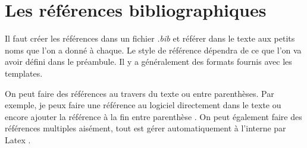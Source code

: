 \documentclass[../exemple_master.tex]{subfiles}
\begin{document}
\section{Les références bibliographiques}

Il faut créer les références dans un fichier \emph{.bib} et référer dans le texte aux petits noms que l'on a donné à chaque. Le style de référence dépendra de ce que l'on va avoir défini dans le préambule. Il y a généralement des formats fournis avec les templates.

On peut faire des références au travers du texte ou entre parenthèses. Par exemple, je peux faire une référence au logiciel \cite{WHAT2016} directement dans le texte ou encore ajouter la référence à la fin entre parenthèse \citep{WHAT2016}. On peut également faire des références multiples aisément, tout est gérer automatiquement à l'interne par Latex \citep{WHAT2016,ladeveze2016}.
\end{document}
